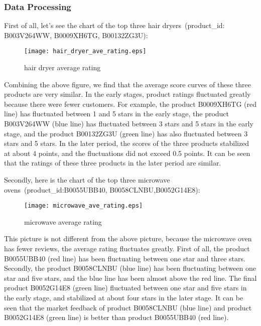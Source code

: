 \documentclass{mcmthesis}
\begin{document}
	\subsubsection{Data Processing}
	
	First of all, let's see the chart of the top three hair dryers\ (product\_id: B003V264WW, B0009XH6TG, B00132ZG3U):
	
	\begin{figure}[H]
		\small
		\centering
		\texttt{[image: hair\_dryer\_ave\_rating.eps]}
		\caption{hair dryer average rating} \label{fig:hair dryer average rating}
	\end{figure}
	
	Combining the above figure, we find that the average score curves of these three products are very similar. In the early stages, product ratings fluctuated greatly because there were fewer customers. For example, the product B0009XH6TG (red line) has fluctuated between 1 and 5 stars in the early stage, the product B003V264WW (blue line) has fluctuated between 3 stars and 5 stars in the early stage, and the product B00132ZG3U (green line) has also fluctuated between 3 stars and 5 stars. In the later period, the scores of the three products stabilized at about 4 points, and the fluctuations did not exceed 0.5 points. It can be seen that the ratings of these three products in the later period are similar.
	
	Secondly, here is the chart of the top three microwave ovens\    (product\_id:B0055UBB40, B0058CLNBU,B0052G14E8):
	
	\begin{figure}[H]
		\small
		\centering
		\texttt{[image: microwave\_ave\_rating.eps]}
		\caption{microwave average rating} \label{fig:micorwave average rating}
	\end{figure}
	
	This picture is not different from the above picture, because the microwave oven has fewer reviews, the average rating fluctuates greatly. First of all, the product B0055UBB40 (red line) has been fluctuating between one star and three stars. Secondly, the product B0058CLNBU (blue line) has been fluctuating between one star and five stars, and the blue line has been almost above the red line. The final product B0052G14E8 (green line) fluctuated between one star and five stars in the early stage, and stabilized at about four stars in the later stage. It can be seen that the market feedback of product B0058CLNBU (blue line) and product B0052G14E8 (green line) is better than product B0055UBB40 (red line).
	
\end{document}
